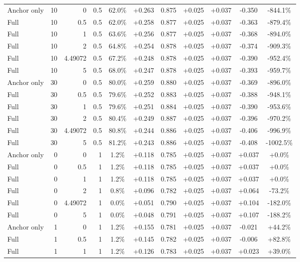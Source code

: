 \begin{table}[htbp]
\begin{tabular}{lrrrccccccc}
Anchor only & 10 & 0 & 0.5 & 62.0\% & +0.263 & 0.875 & +0.025 & +0.037 & -0.350 & -844.1\% \\
Full & 10 & 0.5 & 0.5 & 62.0\% & +0.258 & 0.877 & +0.025 & +0.037 & -0.363 & -879.4\% \\
Full & 10 & 1 & 0.5 & 63.6\% & +0.256 & 0.877 & +0.025 & +0.037 & -0.368 & -894.0\% \\
Full & 10 & 2 & 0.5 & 64.8\% & +0.254 & 0.878 & +0.025 & +0.037 & -0.374 & -909.3\% \\
Full & 10 & 4.49072 & 0.5 & 67.2\% & +0.248 & 0.878 & +0.025 & +0.037 & -0.390 & -952.4\% \\
Full & 10 & 5 & 0.5 & 68.0\% & +0.247 & 0.878 & +0.025 & +0.037 & -0.393 & -959.7\% \\
Anchor only & 30 & 0 & 0.5 & 80.0\% & +0.259 & 0.880 & +0.025 & +0.037 & -0.369 & -896.0\% \\
Full & 30 & 0.5 & 0.5 & 79.6\% & +0.252 & 0.883 & +0.025 & +0.037 & -0.388 & -948.1\% \\
Full & 30 & 1 & 0.5 & 79.6\% & +0.251 & 0.884 & +0.025 & +0.037 & -0.390 & -953.6\% \\
Full & 30 & 2 & 0.5 & 80.4\% & +0.249 & 0.887 & +0.025 & +0.037 & -0.396 & -970.2\% \\
Full & 30 & 4.49072 & 0.5 & 80.8\% & +0.244 & 0.886 & +0.025 & +0.037 & -0.406 & -996.9\% \\
Full & 30 & 5 & 0.5 & 81.2\% & +0.243 & 0.886 & +0.025 & +0.037 & -0.408 & -1002.5\% \\
Anchor only & 0 & 0 & 1 & 1.2\% & +0.118 & 0.785 & +0.025 & +0.037 & +0.037 & +0.0\% \\
Full & 0 & 0.5 & 1 & 1.2\% & +0.118 & 0.785 & +0.025 & +0.037 & +0.037 & +0.0\% \\
Full & 0 & 1 & 1 & 1.2\% & +0.118 & 0.785 & +0.025 & +0.037 & +0.037 & +0.0\% \\
Full & 0 & 2 & 1 & 0.8\% & +0.096 & 0.782 & +0.025 & +0.037 & +0.064 & -73.2\% \\
Full & 0 & 4.49072 & 1 & 0.0\% & +0.051 & 0.790 & +0.025 & +0.037 & +0.104 & -182.0\% \\
Full & 0 & 5 & 1 & 0.0\% & +0.048 & 0.791 & +0.025 & +0.037 & +0.107 & -188.2\% \\
Anchor only & 1 & 0 & 1 & 1.2\% & +0.155 & 0.781 & +0.025 & +0.037 & -0.021 & +44.2\% \\
Full & 1 & 0.5 & 1 & 1.2\% & +0.145 & 0.782 & +0.025 & +0.037 & -0.006 & +82.8\% \\
Full & 1 & 1 & 1 & 1.2\% & +0.126 & 0.783 & +0.025 & +0.037 & +0.023 & +39.0\% \\

\end{tabular}
\end{table}
